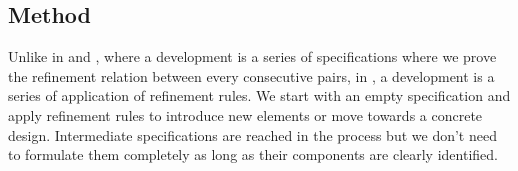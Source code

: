 \subsection{Method}
\label{sec:method}
Unlike in \eventB and \unity, where a development is a series of specifications where we prove the refinement relation between every consecutive pairs, in \unitb, a development is a series of application of refinement rules.  We start with an empty specification and apply refinement rules to introduce new elements or move towards a concrete design. Intermediate specifications are reached in the process but we don't need to formulate them completely as long as their components are clearly identified. 

